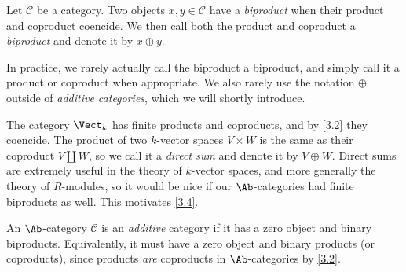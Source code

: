 \begin{definition}\label{3.3}
	Let $\mathcal{C} $ be a category. Two objects $x,y\in \mathcal{C} $ have a \emph{biproduct} when their product and coproduct coencide. We then call both the product and coproduct a \emph{biproduct} and denote it by $x\oplus y$.
\end{definition}

In practice, we rarely actually call the biproduct a biproduct, and simply call it a product or coproduct when appropriate. We also rarely use the notation $\oplus $ outside of \emph{additive categories}, which we will shortly introduce.

The category $\Vect_k$ has finite products and coproducts, and by \cref{3.2} they coencide. The product of two $k$-vector spaces $V\times W$ is the same as their coproduct $V\amalg W$, so we call it a \emph{direct sum} and denote it by $V\oplus W$. Direct sums are extremely useful in the theory of $k$-vector spaces, and more generally the theory of $R$-modules, so it would be nice if our $\Ab $-categories had finite biproducts as well. This motivates \cref{3.4}.

\begin{definition}\label{3.4}
	An $\Ab $-category $\mathcal{C} $ is an \emph{additive} category if it has a zero object and binary biproducts. Equivalently, it must have a zero object and binary products (or coproducts), since products \emph{are} coproducts in $\Ab $-categories by \cref{3.2}.
\end{definition}
